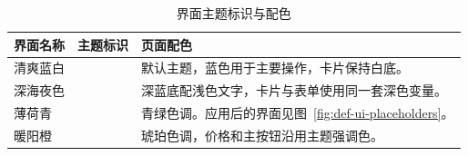 \begin{table}[H]
\centering
\reporttablesize
\caption{界面主题标识与配色}\label{tab:theme-tokens}
\begin{tabularx}{\linewidth}{@{}L{.21\linewidth}L{.16\linewidth}Y@{}}
\toprule
\textbf{界面名称} & \textbf{主题标识} & \textbf{页面配色} \\
\midrule
清爽蓝白 &  & 默认主题，蓝色用于主要操作，卡片保持白底。 \\
深海夜色 &  & 深蓝底配浅色文字，卡片与表单使用同一套深色变量。 \\
薄荷青 &  & 青绿色调。应用后的界面见图~\ref{fig:def-ui-placeholders}。 \\
暖阳橙 &  & 琥珀色调，价格和主按钮沿用主题强调色。 \\
\bottomrule
\end{tabularx}
\end{table}
